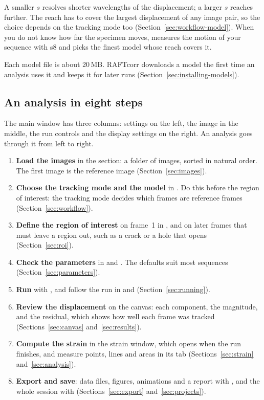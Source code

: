 A smaller $s$ resolves shorter wavelengths of the displacement; a larger $s$ reaches further. The
reach has to cover the largest displacement of any image pair, so the choice depends on the
tracking mode too (Section~\ref{sec:workflow-model}). When you do not know how far the specimen
moves,  measures the motion of your sequence with s8 and picks the finest
model whose reach covers it.

Each model file is about 20\,MB. RAFTcorr downloads a model the first time an analysis uses it
and keeps it for later runs (Section~\ref{sec:installing-models}).

\subsection{An analysis in eight steps}
\label{sec:overview-steps}

The main window has three columns: settings on the left, the image in the middle, the run controls
and the display settings on the right. An analysis goes through it from left to right.

\begin{enumerate}
  \item \textbf{Load the images} in the  section: a folder of images, sorted in natural
    order. The first image is the reference image (Section~\ref{sec:images}).
  \item \textbf{Choose the tracking mode and the model} in . Do this before the
    region of interest: the tracking mode decides which frames are reference frames
    (Section~\ref{sec:workflow}).
  \item \textbf{Define the region of interest} on frame~1 in , and on
    later frames that must leave a region out, such as a crack or a hole that opens
    (Section~\ref{sec:roi}).
  \item \textbf{Check the parameters} in  and . The defaults suit most
    sequences (Section~\ref{sec:parameters}).
  \item \textbf{Run} with , and follow the run in  and 
    (Section~\ref{sec:running}).
  \item \textbf{Review the displacement} on the canvas: each component, the magnitude, and the
    residual, which shows how well each frame was tracked (Sections~\ref{sec:canvas}
    and~\ref{sec:results}).
  \item \textbf{Compute the strain} in the strain window, which opens when the run finishes, and
    measure points, lines and areas in its  tab (Sections~\ref{sec:strain}
    and~\ref{sec:analysis}).
  \item \textbf{Export and save}: data files, figures, animations and a report with
    , and the whole session with 
    (Sections~\ref{sec:export} and~\ref{sec:projects}).
\end{enumerate}

